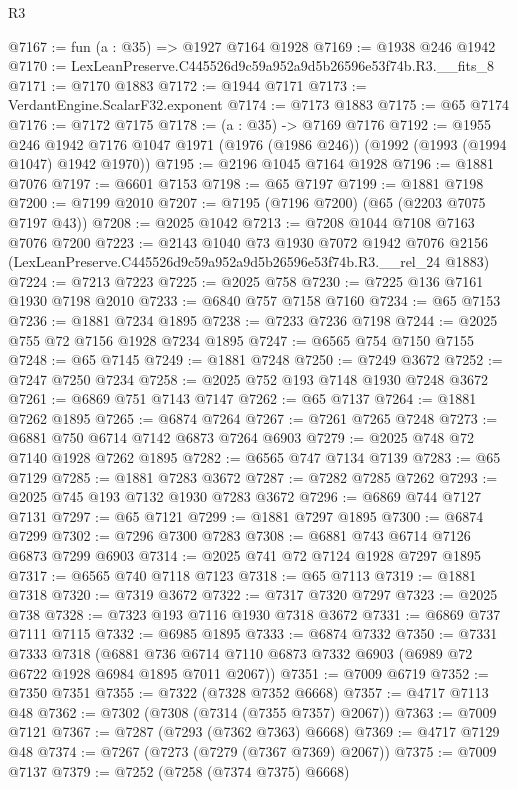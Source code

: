\begin{lexlean}{R3}
\begin{coremodule}
@7167 := fun (a : @35) => @1927 @7164 @1928
@7169 := @1938 @246 @1942
@7170 := LexLeanPreserve.C445526d9c59a952a9d5b26596e53f74b.R3.__fits_8
@7171 := @7170 @1883
@7172 := @1944 @7171
@7173 := VerdantEngine.ScalarF32.exponent
@7174 := @7173 @1883
@7175 := @65 @7174
@7176 := @7172 @7175
@7178 := (a : @35) -> @7169 @7176
@7192 := @1955
    @246
    @1942
    @7176
    @1047
    @1971
    (@1976 (@1986 @246))
    (@1992 (@1993 (@1994 @1047) @1942 @1970))
@7195 := @2196 @1045 @7164 @1928
@7196 := @1881 @7076
@7197 := @6601 @7153
@7198 := @65 @7197
@7199 := @1881 @7198
@7200 := @7199 @2010
@7207 := @7195 (@7196 @7200) (@65 (@2203 @7075 @7197 @43))
@7208 := @2025 @1042
@7213 := @7208 @1044 @7108 @7163 @7076 @7200
@7223 := @2143
    @1040
    @73
    @1930
    @7072
    @1942
    @7076
    @2156
    (LexLeanPreserve.C445526d9c59a952a9d5b26596e53f74b.R3.__rel_24 @1883)
@7224 := @7213 @7223
@7225 := @2025 @758
@7230 := @7225 @136 @7161 @1930 @7198 @2010
@7233 := @6840 @757 @7158 @7160
@7234 := @65 @7153
@7236 := @1881 @7234 @1895
@7238 := @7233 @7236 @7198
@7244 := @2025 @755 @72 @7156 @1928 @7234 @1895
@7247 := @6565 @754 @7150 @7155
@7248 := @65 @7145
@7249 := @1881 @7248
@7250 := @7249 @3672
@7252 := @7247 @7250 @7234
@7258 := @2025 @752 @193 @7148 @1930 @7248 @3672
@7261 := @6869 @751 @7143 @7147
@7262 := @65 @7137
@7264 := @1881 @7262 @1895
@7265 := @6874 @7264
@7267 := @7261 @7265 @7248
@7273 := @6881 @750 @6714 @7142 @6873 @7264 @6903
@7279 := @2025 @748 @72 @7140 @1928 @7262 @1895
@7282 := @6565 @747 @7134 @7139
@7283 := @65 @7129
@7285 := @1881 @7283 @3672
@7287 := @7282 @7285 @7262
@7293 := @2025 @745 @193 @7132 @1930 @7283 @3672
@7296 := @6869 @744 @7127 @7131
@7297 := @65 @7121
@7299 := @1881 @7297 @1895
@7300 := @6874 @7299
@7302 := @7296 @7300 @7283
@7308 := @6881 @743 @6714 @7126 @6873 @7299 @6903
@7314 := @2025 @741 @72 @7124 @1928 @7297 @1895
@7317 := @6565 @740 @7118 @7123
@7318 := @65 @7113
@7319 := @1881 @7318
@7320 := @7319 @3672
@7322 := @7317 @7320 @7297
@7323 := @2025 @738
@7328 := @7323 @193 @7116 @1930 @7318 @3672
@7331 := @6869 @737 @7111 @7115
@7332 := @6985 @1895
@7333 := @6874 @7332
@7350 := @7331
    @7333
    @7318
    (@6881 @736 @6714 @7110 @6873 @7332 @6903 (@6989 @72 @6722 @1928 @6984 @1895 @7011 @2067))
@7351 := @7009 @6719
@7352 := @7350 @7351
@7355 := @7322 (@7328 @7352 @6668)
@7357 := @4717 @7113 @48
@7362 := @7302 (@7308 (@7314 (@7355 @7357) @2067))
@7363 := @7009 @7121
@7367 := @7287 (@7293 (@7362 @7363) @6668)
@7369 := @4717 @7129 @48
@7374 := @7267 (@7273 (@7279 (@7367 @7369) @2067))
@7375 := @7009 @7137
@7379 := @7252 (@7258 (@7374 @7375) @6668)

\end{coremodule}
\end{lexlean}
